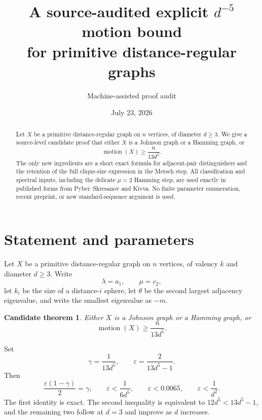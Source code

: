 \documentclass[11pt]{amsart}
\title[An explicit $d^{-5}$ motion bound]{A source-audited explicit $d^{-5}$ motion bound\\for primitive distance-regular graphs}
\author{Machine-assisted proof audit}
\date{July 23, 2026}
\newtheorem{candidate}[theorem]{Candidate theorem}
\theoremstyle{definition}
\newcommand{\mot}{\operatorname{motion}}
\newcommand{\eps}{\varepsilon}
\newcommand{\gam}{\gamma}
\begin{document}
\begin{abstract}
Let $X$ be a primitive distance-regular graph on $n$ vertices, of diameter $d\ge3$.
We give a source-level candidate proof that either $X$ is a Johnson graph or a Hamming graph, or
\[
 \mot(X)\ge \frac{n}{13d^5}.
\]
The only new ingredients are a short exact formula for adjacent-pair distinguishers and the retention of the full clique-size expression in the Metsch step.  All classification and spectral inputs, including the delicate $\mu=2$ Hamming step, are used exactly in published forms from Pyber--Skresanov and Kivva.  No finite parameter enumeration, recent preprint, or new standard-sequence argument is used.
\end{abstract}
\maketitle

\begin{center}
\end{center}

\section{Statement and parameters}
Let $X$ be a primitive distance-regular graph on $n$ vertices, of valency $k$ and diameter $d\ge3$.  Write
\[
 \lambda=a_1,\qquad \mu=c_2,
\]
let $k_i$ be the size of a distance-$i$ sphere, let $\theta$ be the second largest adjacency eigenvalue, and write the smallest eigenvalue as $-m$.

\begin{candidate}\label{thm:main}
Either $X$ is a Johnson graph or a Hamming graph, or
\[
 \boxed{\mot(X)\ge \frac{n}{13d^5}.}
\]
\end{candidate}

Set
\begin{equation}\label{eq:parameters}
 \gam=\frac1{13d^5},\qquad
 \eps=\frac{2}{13d^5-1}.
\end{equation}
Then
\begin{equation}\label{eq:closure}
 \frac{\eps(1-\gam)}2=\gam,
 \qquad
 \eps<\frac1{6d^5},
 \qquad
 \eps<0.0065,
 \qquad
 \eps<\frac1{d^2}.
\end{equation}
The first identity is exact.  The second inequality is equivalent to $12d^5<13d^5-1$, and the remaining two follow at $d=3$ and improve as $d$ increases.
\end{document}
